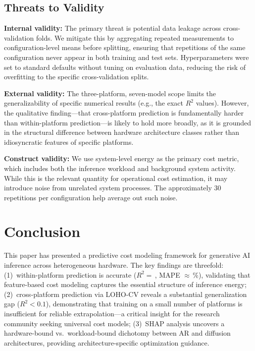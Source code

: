 \documentclass[preprint,review,12pt]{elsarticle}
\begin{document}
\subsection{Threats to Validity}
\label{sec:threats}

\textbf{Internal validity:}
The primary threat is potential data leakage across cross-validation folds.
We mitigate this by aggregating repeated measurements to configuration-level means before splitting, ensuring that repetitions of the same configuration never appear in both training and test sets.
Hyperparameters were set to standard defaults without tuning on evaluation data, reducing the risk of overfitting to the specific cross-validation splits.

\textbf{External validity:}
The three-platform, seven-model scope limits the generalizability of specific numerical results (e.g., the exact $R^2$ values).
However, the qualitative finding---that cross-platform prediction is fundamentally harder than within-platform prediction---is likely to hold more broadly, as it is grounded in the structural difference between hardware architecture classes rather than idiosyncratic features of specific platforms.

\textbf{Construct validity:}
We use system-level energy as the primary cost metric, which includes both the inference workload and background system activity.
While this is the relevant quantity for operational cost estimation, it may introduce noise from unrelated system processes.
The approximately 30 repetitions per configuration help average out such noise.


\section{Conclusion}
\label{sec:conclusion}

This paper has presented a predictive cost modeling framework for generative AI inference across heterogeneous hardware.
The key findings are threefold:
(1)~within-platform prediction is accurate ($R^2 {=}$\,\unskip, MAPE ${\approx}$\,\unskip\%), validating that feature-based cost modeling captures the essential structure of inference energy;
(2)~cross-platform prediction via LOHO-CV reveals a substantial generalization gap ($R^2 {<} 0.1$), demonstrating that training on a small number of platforms is insufficient for reliable extrapolation---a critical insight for the research community seeking universal cost models;
(3)~SHAP analysis uncovers a hardware-bound vs.\ workload-bound dichotomy between AR and diffusion architectures, providing architecture-specific optimization guidance.
\end{document}

